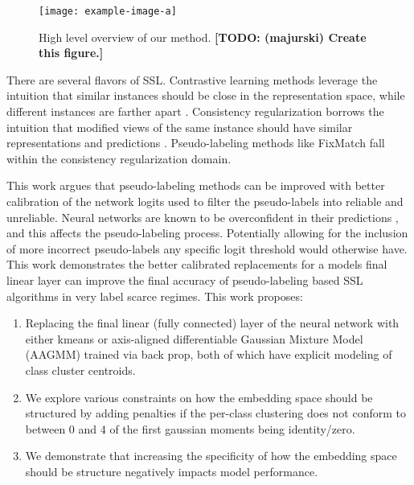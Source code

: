 \documentclass[10pt,twocolumn,letterpaper]{article}
\newcommand{\TODO}[1]{\textbf{\color{red}[TODO: #1]}}
\begin{document}
\begin{figure}[ht]
	\centering
	\texttt{[image: example-image-a]}
	\caption{High level overview of our method. \TODO {(majurski) Create this figure.}}
	\label{fig:schema}
\end{figure}

There are several flavors of SSL.
Contrastive learning methods leverage the intuition that similar instances should be close in the representation space, while different instances are farther apart \cite{yang2022class,li2021comatch}.
Consistency regularization borrows the intuition that modified views of the same instance should have similar representations and predictions \cite{sohn2020fixmatch,lee2022contrastive,zhang2021flexmatch,kim2022conmatch}.
Pseudo-labeling methods like FixMatch \cite{sohn2020fixmatch} fall within the consistency regularization domain.

This work argues that pseudo-labeling methods can be improved with better calibration of the network logits used to filter the pseudo-labels into reliable and unreliable. 
Neural networks are known to be overconfident in their predictions \cite{wei2022mitigating}, and this affects the pseudo-labeling process. 
Potentially allowing for the inclusion of more incorrect pseudo-labels any specific logit threshold would otherwise have.
This work demonstrates the better calibrated replacements for a models final linear layer can improve the final accuracy of pseudo-labeling based SSL algorithms in very label scarce regimes. 
This work proposes:

\begin{enumerate}
	\item Replacing the final linear (fully connected) layer of the neural network with either kmeans \cite{dwibedi2021little} or axis-aligned differentiable Gaussian Mixture Model (AAGMM) trained via back prop, both of which have explicit modeling of class cluster centroids. 
	\item We explore various constraints on how the embedding space should be structured by adding penalties if the per-class clustering does not conform to between 0 and 4 of the first gaussian moments being identity/zero.
	\item We demonstrate that increasing the specificity of how the embedding space should be structure negatively impacts model performance. \cite{pearson1936method}
\end{enumerate}
\end{document}
